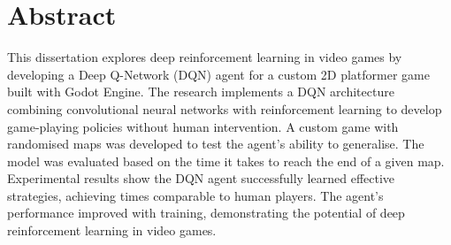 
\chapter*{Abstract}

This dissertation explores deep reinforcement learning in video games by developing a Deep Q-Network (DQN) agent for a custom 2D platformer game built with Godot Engine. 
The research implements a DQN architecture combining convolutional neural networks with reinforcement learning to develop game-playing policies without human intervention.
A custom game with randomised maps was developed to test the agent's ability to generalise.
The model was evaluated based on the time it takes to reach the end of a given map.
Experimental results show the DQN agent successfully learned effective strategies, achieving times comparable to human players.
The agent's performance improved with training, demonstrating the potential of deep reinforcement learning in video games.

